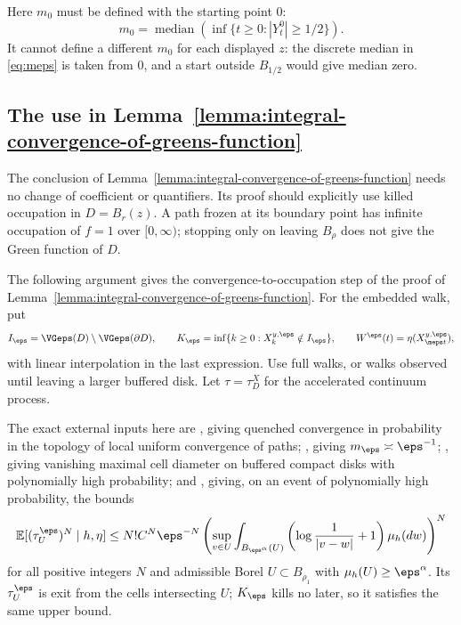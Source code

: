 \begin{remark}\label{rem:occ-m0}
Here $m_0$ must be defined with the starting point $0$:
\[
 m_0=\operatorname{median}
       \left(\inf\{t\geq0:|Y_t^0|\geq1/2\}\right).
\]
It cannot define a different $m_0$ for each displayed $z$:
the discrete median in \eqref{eq:meps} is taken from $0$,
and a start outside $B_{1/2}$ would give median zero.
\end{remark}

\subsection{The use in Lemma~\ref{lemma:integral-convergence-of-greens-function}}\label{sec:occ-use}

The conclusion of Lemma~\ref{lemma:integral-convergence-of-greens-function}
needs no change of coefficient or quantifiers. Its proof should explicitly
use killed occupation in $D=B_r(z)$. A path frozen at its boundary point
has infinite occupation of $f=1$ over $[0,\infty)$; stopping only on
leaving $B_\rho$ does not give the Green function of $D$.

The following argument gives the convergence-to-occupation step of the
proof of Lemma~\ref{lemma:integral-convergence-of-greens-function}.
For the embedded walk, put
\[
 I_\eps=\VGeps(D)\setminus\VGeps(\partial D),\qquad
 K_\eps=\inf\{k\geq0:X_k^{y,\eps}\notin I_\eps\},\qquad
 W^\eps(t)=\eta(X^{y,\eps}_{\meps t}),
\]
with linear interpolation in the last expression. Use full walks,
or walks observed until leaving a larger buffered disk.
Let $\tau=\tau_D^X$ for the accelerated continuum process.

The exact external inputs here are
\cite[Theorem 1.2, p.~10]{berestycki2020random}, giving quenched convergence in
probability in the topology of local uniform convergence of paths;
\cite[Remark 1.3, equation (1.8), p.~10]{berestycki2020random}, giving
$m_\eps\asymp\eps^{-1}$; \cite[Lemma 2.4, equation (2.8),
p.~17]{berestycki2020random}, giving vanishing maximal cell diameter on buffered
compact disks with polynomially high probability; and
\cite[Proposition 5.1, equation (5.1), p.~28]{berestycki2020random}, giving,
on an event of polynomially high probability, the bounds
\begin{equation}\label{eq:occ-discretemom}
 \mathbb{E}[(\tau^\eps_U)^N\mid h,\eta]
 \leq N!C^N\eps^{-N}
  \left(\sup_{v\in U}
       \int_{B_{\eps^\alpha}(U)}
         \left(\log\frac1{|v-w|}+1\right)\mu_h(dw)\right)^N
\end{equation}
for all positive integers $N$ and admissible Borel
$U\subset B_{\rho_1}$ with $\mu_h(U)\geq\eps^\alpha$.
Its $\tau_U^\eps$ is exit from the cells intersecting $U$;
$K_\eps$ kills no later, so it satisfies the same upper bound.

